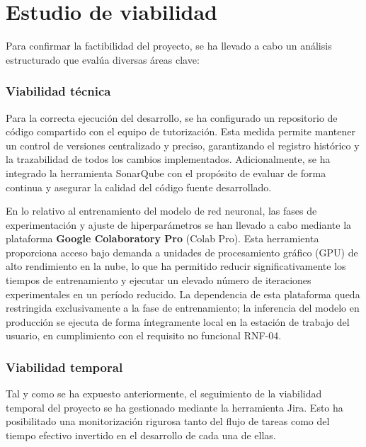 \section{Estudio de viabilidad}

Para confirmar la factibilidad del proyecto, se ha llevado a cabo un análisis
estructurado que evalúa diversas áreas clave:

\subsubsection*{Viabilidad técnica}

Para la correcta ejecución del desarrollo, se ha configurado un repositorio de
código compartido con el equipo de tutorización. Esta medida permite mantener un
control de versiones centralizado y preciso, garantizando el registro histórico y la
trazabilidad de todos los cambios implementados. Adicionalmente, se ha integrado la
herramienta SonarQube con el propósito de evaluar de forma continua y asegurar la
calidad del código fuente desarrollado.

En lo relativo al entrenamiento del modelo de red neuronal, las fases de
experimentación y ajuste de hiperparámetros se han llevado a cabo mediante la
plataforma \textbf{Google Colaboratory Pro} (Colab Pro). Esta herramienta
proporciona acceso bajo demanda a unidades de procesamiento gráfico (GPU) de
alto rendimiento en la nube, lo que ha permitido reducir significativamente los
tiempos de entrenamiento y ejecutar un elevado número de iteraciones experimentales
en un período reducido. La dependencia de esta plataforma queda restringida
exclusivamente a la fase de entrenamiento; la inferencia del modelo en producción se
ejecuta de forma íntegramente local en la estación de trabajo del usuario, en
cumplimiento con el requisito no funcional RNF-04.
\subsubsection*{Viabilidad temporal}

Tal y como se ha expuesto anteriormente, el seguimiento de la viabilidad temporal
del proyecto se ha gestionado mediante la herramienta Jira. Esto ha posibilitado una
monitorización rigurosa tanto del flujo de tareas como del tiempo efectivo invertido
en el desarrollo de cada una de ellas.

